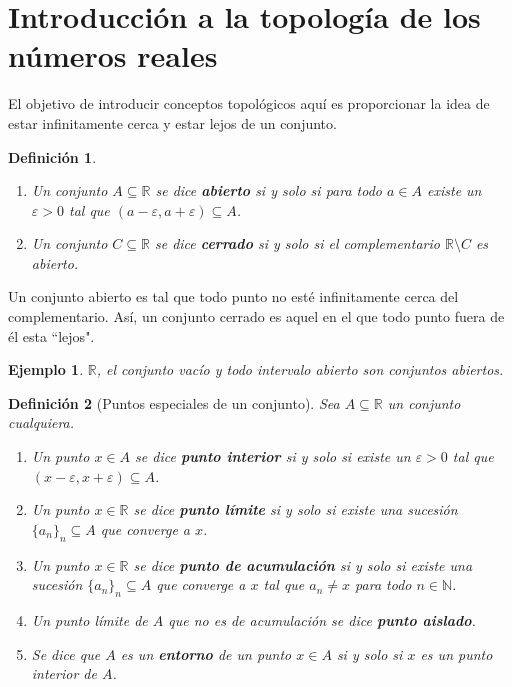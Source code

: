 \documentclass{article}
\newtheorem{define}{Definición}
\newtheorem{ejem}{Ejemplo}
\newcommand{\reales}{\mathbb{R}}
\newcommand{\naturales}{\mathbb{N}}
\newcommand{\sucesion}[1]{\{ #1 _n \}_n}
\begin{document}
\section{Introducción a la topología de los números reales}

El objetivo de introducir conceptos topológicos aquí es proporcionar la idea de estar infinitamente cerca y estar lejos de un conjunto.

\begin{define}
\begin{enumerate}
	\item
	Un conjunto $A \subseteq \reales$ se dice \textbf{abierto} si y solo si para todo $a \in A$ existe un $\varepsilon > 0$ tal que $(a - \varepsilon, a + \varepsilon) \subseteq A$.
	\item 
	Un conjunto $C \subseteq \reales$ se dice \textbf{cerrado} si y solo si el complementario $\reales \setminus C$ es abierto.
\end{enumerate}
\end{define}

Un conjunto abierto es tal que todo punto no esté infinitamente cerca del complementario. Así, un conjunto cerrado es aquel en el que todo punto fuera de él esta ``lejos".

\begin{ejem}
	$\reales$, el conjunto vacío y todo intervalo abierto son conjuntos abiertos.
\end{ejem}

\begin{define}[Puntos especiales de un conjunto]
	Sea $A \subseteq \reales$ un conjunto cualquiera.
	\begin{enumerate}
		\item
		Un punto $x \in A$ se dice \textbf{punto interior} si y solo si existe un $\varepsilon > 0$ tal que $(x - \varepsilon, x + \varepsilon) \subseteq A$.
		\item
		Un punto $x \in \reales$ se dice \textbf{punto límite} si y solo si existe una sucesión $\sucesion{a} \subseteq A$ que converge a $x$.
		\item
		Un punto $x \in \reales $ se dice \textbf{punto de acumulación} si y solo si existe una sucesión $\sucesion{a} \subseteq A$ que converge a $x$ tal que $a_n \neq x$ para todo $n \in \naturales$.
		\item
		Un punto límite de $A$ que no es de acumulación se dice \textbf{punto aislado}.
		\item
		Se dice que $A$ es un \textbf{entorno} de un punto $x \in A$ si y solo si $x$ es un punto interior de $A$.
	\end{enumerate}
\end{define}
\end{document}
